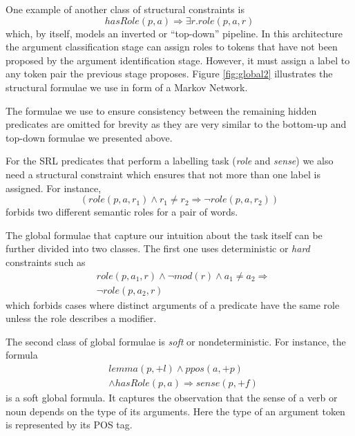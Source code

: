 One example of another class of structural constraints is 
\[
hasRole(p,a)\Rightarrow\exists r.role(p,a,r)
\]
which, by itself, models an inverted or ``top-down'' pipeline. In this architecture the argument classification stage can assign roles to tokens that have not been proposed by the argument identification stage. However, it must assign a label to any token pair the previous stage proposes. 
Figure \ref{fig:global2} illustrates the structural formulae we use in form of a Markov Network.

The formulae we use to ensure consistency between the remaining hidden predicates are omitted for brevity as they are very similar to the bottom-up and top-down formulae we presented above.

For the SRL predicates that perform a labelling task (\emph{role} and \emph{sense}) we also need a structural constraint which ensures that not more than one label is assigned. For instance,
\[
(role(p,a,r_1) \wedge r_1 \neq r_2 \Rightarrow \neg role(p,a,r_2)  )
\]
forbids two different semantic roles for a pair of words. 


The global formulae that capture our intuition about the task itself can be further divided into two classes. The first one uses deterministic or \emph{hard} constraints such as
\begin{eqnarray*}
 &role\left(p,a_{1},r\right)\wedge \neg mod\left(r\right)\wedge a_{1}\neq a_{2}  \Rightarrow\\
  & \neg role\left(p,a_{2},r\right)
\end{eqnarray*}
which forbids cases where distinct arguments of a predicate have the same role unless the role describes a modifier.

The second class of global formulae is \emph{soft} or nondeterministic. For instance, the formula  
\begin{eqnarray*}
  & lemma(p,+l) \wedge ppos(a,+p)  \\
  & \wedge hasRole(p,a)  \Rightarrow sense(p,+f) 
\end{eqnarray*}
is a soft global formula. It captures the observation that the sense of a verb or noun depends on the type of its arguments. Here the type of an argument token is represented by its POS tag.

